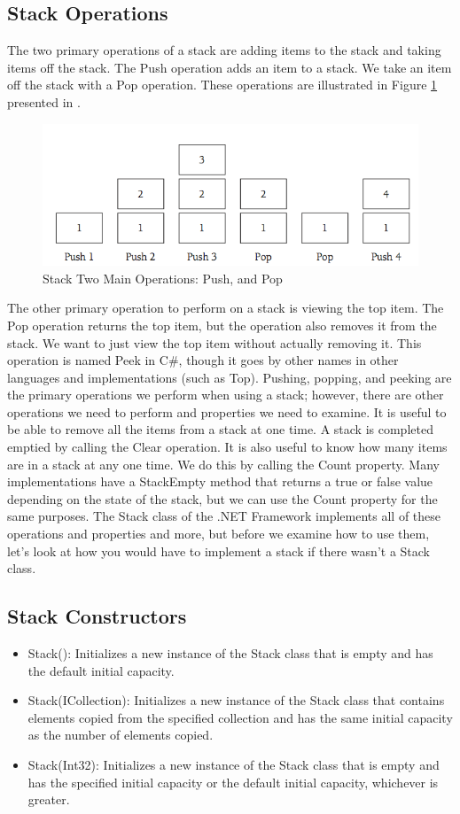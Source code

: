 \documentclass[12pt,a4paper,final,twoside,titlepage]{book}
\begin{document}
\subsection{Stack Operations}
The two primary operations of a stack are adding items to the stack and taking items off the stack. The Push operation adds an item to a stack. We take an item off the stack with a Pop operation. These operations are illustrated in Figure \ref{Stack} presented in \pageref{Stack}.
\begin{figure}
\begin{center}
\includegraphics[scale=0.5]{Stack}
\caption{Stack Two Main Operations: Push, and Pop}
\label{Stack}
\end{center}
\end{figure}
The other primary operation to perform on a stack is viewing the top item. The Pop operation returns the top item, but the operation also removes it from the stack. We want to just view the top item without actually removing it. This operation is named Peek in C\#, though it goes by other names in other languages and implementations (such as Top).
Pushing, popping, and peeking are the primary operations we perform when using a stack; however, there are other operations we need to perform and properties we need to examine. It is useful to be able to remove all the items from a stack at one time. A stack is completed emptied by calling the Clear operation. It is also useful to know how many items are in a stack at any one time. We do this by calling the Count property. Many implementations have a StackEmpty method that returns a true or false value depending on the state of the stack, but we can use the Count property for the same purposes.
The Stack class of the .NET Framework implements all of these operations and properties and more, but before we examine how to use them, let’s look at how you would have to implement a stack if there wasn’t a Stack class.
\subsection{Stack Constructors}
\begin{itemize}
\item Stack(): Initializes a new instance of the Stack class that is empty and has the default initial capacity.
\item Stack(ICollection): Initializes a new instance of the Stack class that contains elements copied from the specified collection and has the same initial capacity as the number of elements copied.
\item Stack(Int32): Initializes a new instance of the Stack class that is empty and has the specified initial capacity or the default initial capacity, whichever is greater.
\end{itemize}
\end{document}
